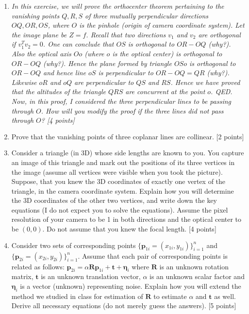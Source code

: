 \documentclass[11pt]{article}
\begin{document}
\begin{enumerate}
\item \textit{In this exercise, we will prove the orthocenter theorem pertaining to the vanishing points $Q,R,S$ of three mutually perpendicular directions $OQ, OR, OS$, where $O$ is the pinhole (origin of camera coordinate system). Let the image plane be $Z = f$. Recall that two directions $v_1$ and $v_2$ are orthogonal if $v^T_1 v_2 = 0$. One can conclude that $OS$ is orthogonal to $OR-OQ$ (why?). Also the optical axis $Oo$ (where $o$ is the optical center) is orthogonal to $OR-OQ$ (why?). Hence the plane formed by triangle $OSo$ is orthogonal to $OR-OQ$ and hence line $oS$ is perpendicular to $OR-OQ = QR$ (why?). Likewise $oR$ and $oQ$ are perpendicular to $QS$ and $RS$. Hence we have proved that the altitudes of the triangle $QRS$ are concurrent at the point $o$. QED. Now, in this proof, I considered the three perpendicular lines to be passing through $O$. How will you modify the proof if the three lines did not pass through $O$? \textsf{[4 points]}}

\item Prove that the vanishing points of three coplanar lines are collinear. \textsf{[2 points]}

\item Consider a triangle (in 3D) whose side lengths are known to you. You capture an image of this triangle and mark out the positions of its three vertices in the image (assume all vertices were visible when you took the picture). Suppose, that you knew the 3D coordinates of exactly one vertex of the triangle, in the camera coordinate system. Explain how you will determine the 3D coordinates of the other two vertices, and write down the key equations (I do not expect you to solve the equations). Assume the pixel resolution of your camera to be 1 in both directions and the optical center to be $(0,0)$. Do not assume that you knew the focal length. \textsf{[4 points]}

\item Consider two sets of corresponding points $\{\mathbf{p}_{1i} = (x_{1i},y_{1i})\}_{i=1}^{n}$ and $\{\mathbf{p}_{2i} = (x_{2i},y_{2i})\}_{i=1}^{n}$. Assume that each pair of corresponding points is related as follows: $\mathbf{p}_{2i} = \alpha \mathbf{R} \mathbf{p}_{1i} + \mathbf{t} + \mathbf{\eta}_i$ where $\mathbf{R}$ is an unknown rotation matrix, $\mathbf{t}$ is an unknown translation vector, $\alpha$ is an unknown scalar factor and $\mathbf{\eta}_i$ is a vector (unknown) representing noise. Explain how you will extend the method we studied in class for estimation of $\mathbf{R}$ to estimate $\alpha$ and $\mathbf{t}$ as well. Derive all necessary equations (do not merely guess the answers). \textsf{[5 points]}


\end{enumerate}
\end{document}
